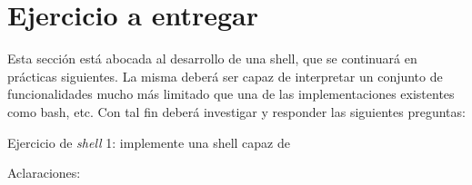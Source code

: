 \section{Ejercicio a entregar}
Esta sección está abocada al desarrollo de una shell, que se continuará en
prácticas siguientes. La misma deberá ser capaz de interpretar un conjunto
de funcionalidades mucho más limitado que una de las implementaciones
existentes como bash, etc.  Con tal fin deberá investigar y responder las
siguientes preguntas:

Ejercicio de \textit{shell} 1: implemente una shell capaz de 

Aclaraciones: 